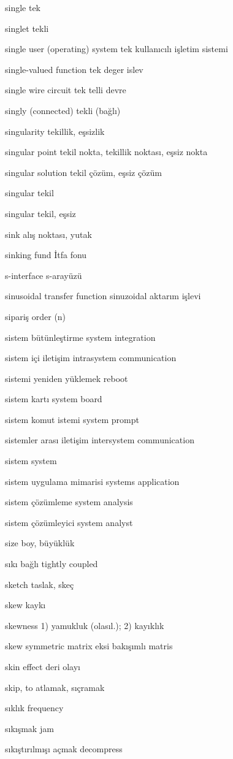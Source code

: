 \documentclass[12pt,fleqn]{article}\usepackage{../../common}
\begin{document}
single tek

singlet tekli

single user (operating) system tek kullanıcılı işletim sistemi

single-valued function tek deger islev

single wire circuit tek telli devre

singly (connected) tekli (bağlı)

singularity tekillik, eşsizlik

singular point tekil nokta, tekillik noktası,  eşsiz nokta

singular solution tekil çözüm, eşsiz çözüm

singular tekil

singular tekil, eşsiz

sink alış noktası, yutak

sinking fund İtfa fonu

s-interface s-arayüzü

sinusoidal transfer function sinuzoidal aktarım işlevi

sipariş order (n)

sistem bütünleştirme system integration

sistem içi iletişim intrasystem communication

sistemi yeniden yüklemek reboot

sistem kartı system board

sistem komut istemi system prompt

sistemler arası iletişim intersystem communication

sistem system

sistem uygulama mimarisi systems application

sistem çözümleme system analysis

sistem çözümleyici system analyst

size boy, büyüklük

sıkı bağlı tightly coupled

sketch taslak, skeç

skew kaykı

skewness 1) yamukluk (olasıl.); 2) kayıklık

skew symmetric matrix eksi bakışımlı matris

skin effect deri olayı

skip, to atlamak, sıçramak

sıklık frequency

sıkışmak jam

sıkıştırılmışı açmak decompress
\end{document}
